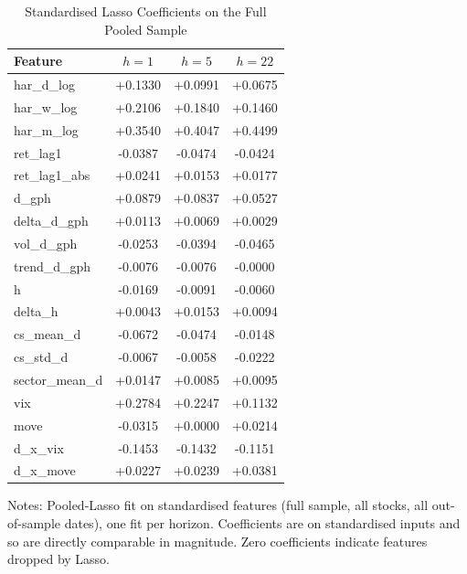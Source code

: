 
\begin{table}[htbp]
\centering
\caption{Standardised Lasso Coefficients on the Full Pooled Sample}
\label{tab:importance}
\small
\begin{tabular}{lccc}
\toprule
Feature & $h=1$ & $h=5$ & $h=22$ \\
\midrule
har\_d\_log & +0.1330 & +0.0991 & +0.0675 \\
har\_w\_log & +0.2106 & +0.1840 & +0.1460 \\
har\_m\_log & +0.3540 & +0.4047 & +0.4499 \\
ret\_lag1 & -0.0387 & -0.0474 & -0.0424 \\
ret\_lag1\_abs & +0.0241 & +0.0153 & +0.0177 \\
d\_gph & +0.0879 & +0.0837 & +0.0527 \\
delta\_d\_gph & +0.0113 & +0.0069 & +0.0029 \\
vol\_d\_gph & -0.0253 & -0.0394 & -0.0465 \\
trend\_d\_gph & -0.0076 & -0.0076 & -0.0000 \\
h & -0.0169 & -0.0091 & -0.0060 \\
delta\_h & +0.0043 & +0.0153 & +0.0094 \\
cs\_mean\_d & -0.0672 & -0.0474 & -0.0148 \\
cs\_std\_d & -0.0067 & -0.0058 & -0.0222 \\
sector\_mean\_d & +0.0147 & +0.0085 & +0.0095 \\
vix & +0.2784 & +0.2247 & +0.1132 \\
move & -0.0315 & +0.0000 & +0.0214 \\
d\_x\_vix & -0.1453 & -0.1432 & -0.1151 \\
d\_x\_move & +0.0227 & +0.0239 & +0.0381 \\
\bottomrule
\end{tabular}
\begin{tablenotes}\small
\item Notes: Pooled-Lasso fit on standardised features (full sample, all stocks, all out-of-sample dates), one fit per horizon. Coefficients are on standardised inputs and so are directly comparable in magnitude. Zero coefficients indicate features dropped by Lasso.
\end{tablenotes}
\end{table}